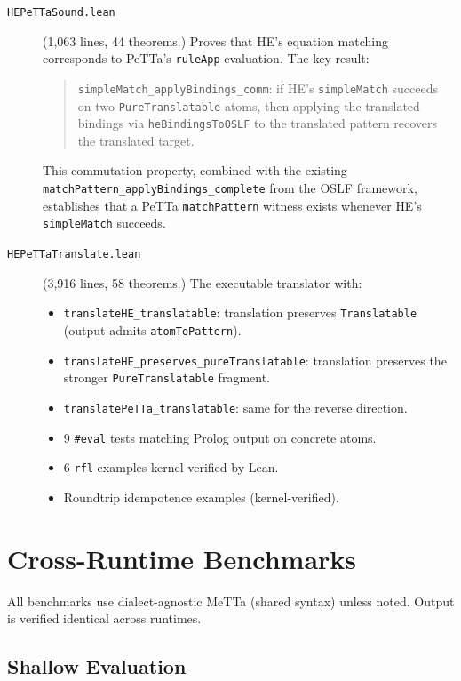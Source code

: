 \documentclass[11pt]{article}
\newcommand{\code}[1]{\texttt{#1}}
\newcommand{\PeTTa}{\textup{PeTTa}}
\newcommand{\HE}{\textup{HE}}
\begin{document}
\begin{description}
\item[\code{HEPeTTaSound.lean}] (1{,}063 lines, 44 theorems.)
  Proves that \HE{}'s equation matching corresponds to \PeTTa{}'s
  \code{ruleApp} evaluation.  The key result:
  \begin{quote}
  \code{simpleMatch\_applyBindings\_comm}: if \HE{}'s
  \code{simpleMatch} succeeds on two \code{PureTranslatable} atoms,
  then applying the translated bindings via \code{heBindingsToOSLF} to
  the translated pattern recovers the translated target.
  \end{quote}
  This commutation property, combined with the existing
  \code{matchPattern\_applyBindings\_complete} from the OSLF framework,
  establishes that a \PeTTa{} \code{matchPattern} witness exists
  whenever \HE{}'s \code{simpleMatch} succeeds.

\item[\code{HEPeTTaTranslate.lean}] (3{,}916 lines, 58 theorems.)
  The executable translator with:
  \begin{itemize}
  \item \code{translateHE\_translatable}: translation preserves
    \code{Translatable} (output admits \code{atomToPattern}).
  \item \code{translateHE\_preserves\_pureTranslatable}: translation
    preserves the stronger \code{PureTranslatable} fragment.
  \item \code{translatePeTTa\_translatable}: same for the reverse
    direction.
  \item 9 \code{\#eval} tests matching Prolog output on concrete atoms.
  \item 6 \code{rfl} examples kernel-verified by Lean.
  \item Roundtrip idempotence examples (kernel-verified).
  \end{itemize}
\end{description}

\section{Cross-Runtime Benchmarks}

All benchmarks use dialect-agnostic MeTTa (shared syntax) unless noted.
Output is verified identical across runtimes.

\subsection{Shallow Evaluation}
\end{document}
